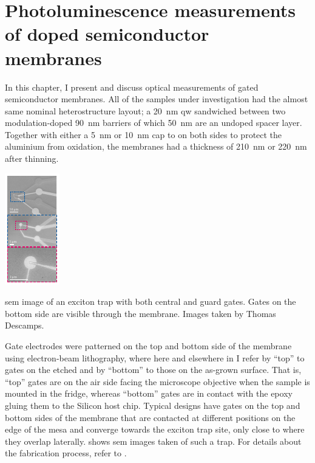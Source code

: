 \chapter{Photoluminescence measurements of doped semiconductor membranes}\label{ch:exp:observations}
In this chapter, I present and discuss optical measurements of gated semiconductor membranes.
All of the samples under investigation had the almost same nominal heterostructure layout; a \qty{20}{\nano\meter}  \gls{qw} sandwiched between two modulation-doped \qty{90}{\nano\meter}  barriers of which \qty{50}{\nano\meter} are an undoped spacer layer.
Together with either a \qty{5}{\nano\meter} or \qty{10}{\nano\meter}  cap to on both sides to protect the aluminium from oxidation, the membranes had a thickness of \qty{210}{\nano\meter} or \qty{220}{\nano\meter} after thinning.

\begin{marginfigure}
    \centering
    \includegraphics{img/pdf/experiment/sem}
    \caption[]{
        \acrshort{sem} image of an exciton trap with both central and guard gates.
        Gates on the bottom side are visible through the membrane.
        Images taken by Thomas Descamps.
    }
    \label{fig:exp:sem}
\end{marginfigure}

Gate electrodes were patterned on the top and bottom side of the membrane using electron-beam lithography, where here and elsewhere in \thethesis I refer by \enquote{top} to gates on the etched and by \enquote{bottom} to those on the as-grown surface.
That is, \enquote{top} gates are on the air side facing the microscope objective when the sample is mounted in the fridge, whereas \enquote{bottom} gates are in contact with the epoxy gluing them to the Silicon host chip.
Typical designs have gates on the top and bottom sides of the membrane that are contacted at different positions on the edge of the mesa and converge towards the exciton trap site, only close to where they overlap laterally.
 shows \acrshort{sem} images taken of such a trap.
For details about the fabrication process, refer to .

